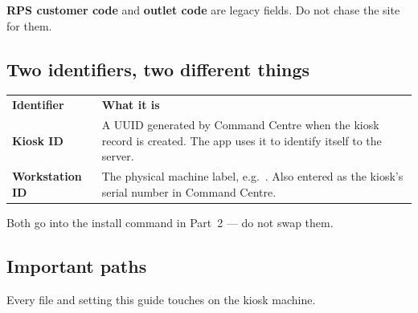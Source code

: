\documentclass[a4paper,10pt]{article}
\begin{document}
\begin{wkwarn}
\textbf{RPS customer code} and \textbf{outlet code} are legacy fields.
Do not chase the site for them.
\end{wkwarn}

\subsection{Two identifiers, two different things}\label{sec:ids}

\begin{center}
\renewcommand{\arraystretch}{1.35}\small
\begin{tabularx}{\textwidth}{L{34mm} X}
\color{white}\textbf{Identifier} &
\color{white}\textbf{What it is}\\
\textbf{Kiosk ID} &
A UUID generated by Command Centre when the kiosk record is created. The
app uses it to identify itself to the server.\\
\textbf{Workstation ID} &
The physical machine label, e.g.\ . Also entered as the
kiosk's serial number in Command Centre.\\
\end{tabularx}
\end{center}

Both go into the install command in Part~2 --- do not swap them.

\subsection{Important paths}\label{sec:paths}

Every file and setting this guide touches on the kiosk machine.
\end{document}
